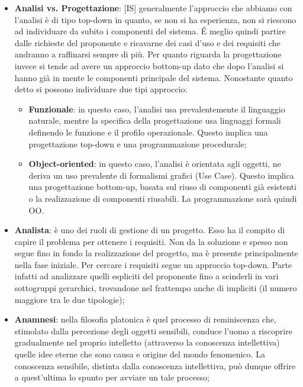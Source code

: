\begin{itemize}
	\item \textbf{Analisi vs. Progettazione}: [IS] generalmente l'approccio che abbiamo con l'analisi è di tipo top-down in quanto, se non si ha esperienza, non si riescono ad individuare da subito i componenti del sistema. \'E meglio quindi partire dalle richieste del proponente e ricavarne dei casi d'uso e dei requisiti che andranno a raffinarsi sempre di più. \newline
	Per quanto riguarda la progettazione invece si tende ad avere un approccio bottom-up dato che dopo l'analisi si hanno già in mente le componenti principale del sistema. \newline
	Nonostante quanto detto si possono individuare due tipi approccio:
		\begin{itemize}
			\item \textbf{Funzionale}: in questo caso, l'analisi usa prevalentemente il linguaggio naturale, mentre la specifica della progettazione usa linguaggi formali definendo le funzione e il profilo operazionale. Questo implica una progettazione top-down e una programmazione procedurale;
			\item \textbf{Object-oriented}: in questo caso, l'analisi è orientata agli oggetti, ne deriva un uso prevalente di formalismi grafici (Use Case). Questo implica una progettazione bottom-up, basata sul riuso di componenti già esistenti o la realizzazione di componenti riusabili. La programmazione sarà quindi OO.
		\end{itemize}

	\item \textbf{Analista}: è uno dei ruoli di gestione di un progetto. Esso ha il compito di capire il problema per ottenere i requisiti. Non da la soluzione e spesso non segue fino in fondo la realizzazione del progetto, ma è presente principalmente nella fase iniziale. \newline
	Per cercare i requisiti segue un approccio top-down. Parte infatti ad analizzare quelli espliciti del proponente fino a scinderli in vari sottogruppi gerarchici, trovandone nel frattempo anche di impliciti (il numero maggiore tra le due tipologie);

	\item \textbf{Anamnesi}: nella filosofia platonica è quel processo di reminiscenza che, stimolato dalla percezione degli oggetti sensibili, conduce l'uomo a riscoprire gradualmente nel proprio intelletto (attraverso la conoscenza intellettiva) quelle idee eterne che sono causa e origine del mondo fenomenico. La conoscenza sensibile, distinta dalla conoscenza intellettiva, può dunque offrire a quest'ultima lo spunto per avviare un tale processo;


\end{itemize}
